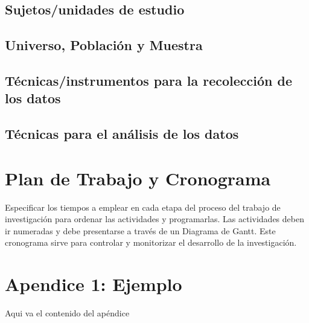 \documentclass[12]{plan_tesis}
\begin{document}
\section{Sujetos/unidades de estudio}
\section{Universo, Población y Muestra }
\section{Técnicas/instrumentos para la recolección de los datos}
\section{Técnicas para el análisis de los datos}

\chapter{Plan de Trabajo y Cronograma}

Especificar los tiempos a emplear en cada etapa del proceso del trabajo de investigación para ordenar las actividades y programarlas. Las actividades deben ir numeradas y debe presentarse a través de un Diagrama de Gantt. Este cronograma sirve para controlar y monitorizar el desarrollo de la investigación. \cite{einstein}





\appendix
\chapter{Apendice 1: Ejemplo}
Aqui va el contenido del apéndice
\end{document}
